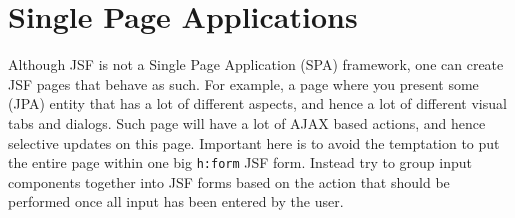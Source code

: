 \section{Single Page Applications}
Although JSF is not a Single Page Application (SPA) framework, one can create JSF pages that behave as such.
For example, a page where you present some (JPA) entity that has a lot of different aspects, and hence a lot of different visual tabs and dialogs.
Such page will have a lot of AJAX based actions, and hence selective updates on this page.
Important here is to avoid the temptation to put the entire page within one big \texttt{h:form} JSF form.
Instead try to group input components together into JSF forms based on  the action that should be performed once all input has been entered by the user.
